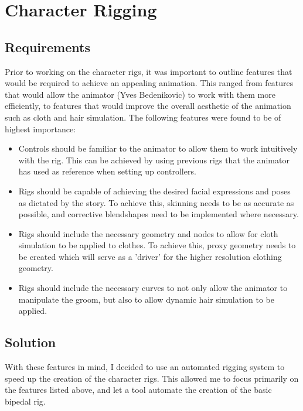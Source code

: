 \documentclass[11pt]{article}
\begin{document}
\section{Character Rigging}

\subsection{Requirements}

Prior to working on the character rigs, it was important to outline features that would be required to achieve an appealing animation. This ranged from features that would allow the animator (Yves Bedenikovic) to work with them more efficiently, to features that would improve the overall aesthetic of the animation such as cloth and hair simulation. The following features were found to be of highest importance:

\begin{itemize}

\item Controls should be familiar to the animator to allow them to work intuitively with the rig. This can be achieved by using previous rigs that the animator has used as reference when setting up controllers.

\item Rigs should be capable of achieving the desired facial expressions and poses as dictated by the story. To achieve this, skinning needs to be as accurate as possible, and corrective blendshapes need to be implemented where necessary.

\item Rigs should include the necessary geometry and nodes to allow for cloth simulation to be applied to clothes. To achieve this, proxy geometry needs to be created which will serve as a 'driver' for the higher resolution clothing geometry.

\item Rigs should include the necessary curves to not only allow the animator to manipulate the groom, but also to allow dynamic hair simulation to be applied.

\end{itemize}

\subsection{Solution}

With these features in mind, I decided to use an automated rigging system to speed up the creation of the character rigs. This allowed me to focus primarily on the features listed above, and let a tool automate the creation of the basic bipedal rig.
\end{document}
